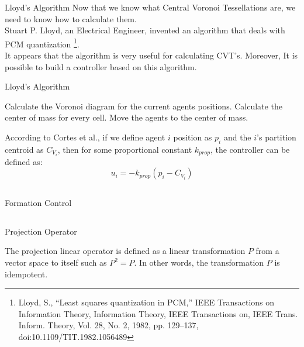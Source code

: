 \documentclass[t]{beamer}
\begin{document}
\begin{frame}[label=lloydsalg1]{Lloyd's Algorithm}
Now that we know what Central Voronoi Tessellations are, we need to know how to calculate them. \\
Stuart P. Lloyd, an Electrical Engineer, invented an algorithm that deals with PCM quantization \footnote{Lloyd, S., “Least squares quantization in PCM,” IEEE Transactions on Information Theory, Information Theory, IEEE Transactions on, IEEE Trans. Inform. Theory, Vol. 28, No. 2, 1982, pp. 129–137, doi:10.1109/TIT.1982.1056489}.
\\
It appears that the algorithm is very useful for calculating CVT's. Moreover, It is possible to build a controller based on this algorithm.
\end{frame}

\begin{frame}[label=lloydsalg2]{Lloyd's Algorithm}
\begin{algorithm}[H]
\caption{Lloyd's Algorithm}\label{LloydAlgo}
\begin{algorithmic}[1]
\State Calculate the Voronoi diagram for the current agents positions.
\State Calculate the center of mass for every cell.
\State Move the agents to the center of mass.
\end{algorithmic}
\end{algorithm}

According to Cortes et al., if we define agent $i$ position as $p_i$ and the $i$'s partition centroid as $C_{V_{i}}$, then for some proportional constant $k_{prop}$, the controller can be defined as:
\begin{equation} \label{LloydsContol}
u_{i} = -k_{prop}\left( p_i - C_{V_{i}} \right)
\end{equation} 

\end{frame}

\subsection[Formation Control]{}
\begin{frame}[label=sl2]{Formation Control}

\end{frame}

\subsection[Projection Operator]{}
\begin{frame}[label=sl2]{Projection Operator}

The projection linear operator is defined as a linear transformation $P$ from a vector space to itself such as $P^2 = P$. In other words, the transformation $P$ is idempotent.

\end{frame}
\end{document}
